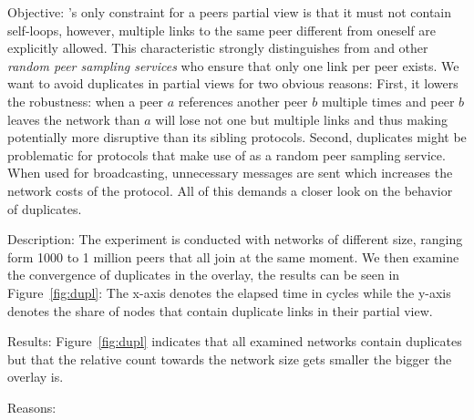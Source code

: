 \begin{asparadesc} 
\item[Objective:] \SPRAY's only constraint for a peers partial view is that
  it must not contain self-loops, however, multiple links to the same peer
  different from oneself are explicitly allowed.  This characteristic strongly
  distinguishes \SPRAY from \CYCLON and other \emph{random peer sampling
    services} who ensure that only one link per peer exists.  We want to avoid
  duplicates in partial views for two obvious reasons: First, it lowers the
  robustness: when a peer $a$ references another peer $b$ multiple times and
  peer $b$ leaves the network than $a$ will lose not one but multiple links and
  thus making \SPRAY potentially more disruptive than its sibling protocols.
  Second, duplicates might be problematic for protocols that make use of
  \SPRAY as a random peer sampling service. When used for broadcasting,
  unnecessary messages are sent which increases the network costs of the
  protocol.  All of this demands a closer look on the behavior of duplicates.
\item[Description:] The experiment is conducted with networks of different
  size, ranging form 1000 to 1 million peers that all join at the same
  moment. We then examine the convergence of duplicates in the overlay, the
  results can be seen in Figure~\ref{fig:dupl}: The x-axis denotes the elapsed
  time in cycles while the y-axis denotes the share of nodes that contain
  duplicate links in their partial view.
\item[Results:] Figure~\ref{fig:dupl} indicates that all examined networks
  contain duplicates but that the relative count towards the network size gets
  smaller the bigger the overlay is. 
\item[Reasons:]

\end{asparadesc}


